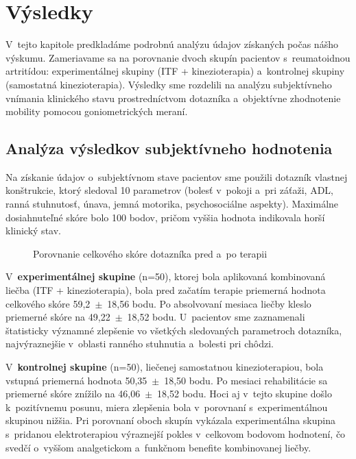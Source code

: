 \chapter{Výsledky}

V~tejto kapitole predkladáme podrobnú analýzu údajov získaných počas nášho výskumu. Zameriavame sa na porovnanie dvoch skupín pacientov s~reumatoidnou artritídou: experimentálnej skupiny (ITF + kinezioterapia) a~kontrolnej skupiny (samostatná kinezioterapia). Výsledky sme rozdelili na analýzu subjektívneho vnímania klinického stavu prostredníctvom dotazníka a~objektívne zhodnotenie mobility pomocou goniometrických meraní.

\section{Analýza výsledkov subjektívneho hodnotenia}

Na získanie údajov o~subjektívnom stave pacientov sme použili dotazník vlastnej konštrukcie, ktorý sledoval 10 parametrov (bolesť v~pokoji a~pri záťaži, ADL, ranná stuhnutosť, únava, jemná motorika, psychosociálne aspekty). Maximálne dosiahnuteľné skóre bolo 100 bodov, pričom vyššia hodnota indikovala horší klinický stav.

\begin{figure}[H]
    \centering
    \caption{Porovnanie celkového skóre dotazníka pred a~po terapii}
    \label{fig:graf_dotaznik}
\end{figure}

V~\textbf{experimentálnej skupine} (n=50), ktorej bola aplikovaná kombinovaná liečba (ITF + kinezioterapia), bola pred začatím terapie priemerná hodnota celkového skóre 59,2~$\pm$~18,56 bodu. Po absolvovaní mesiaca liečby kleslo priemerné skóre na 49,22~$\pm$~18,52 bodu. U~pacientov sme zaznamenali štatisticky významné zlepšenie vo všetkých sledovaných parametroch dotazníka, najvýraznejšie v~oblasti ranného stuhnutia a~bolesti pri chôdzi.

V~\textbf{kontrolnej skupine} (n=50), liečenej samostatnou kinezioterapiou, bola vstupná priemerná hodnota 50,35~$\pm$~18,50 bodu. Po mesiaci rehabilitácie sa priemerné skóre znížilo na 46,06~$\pm$~18,52 bodu. Hoci aj v~tejto skupine došlo k~pozitívnemu posunu, miera zlepšenia bola v~porovnaní s~experimentálnou skupinou nižšia. Pri porovnaní oboch skupín vykázala experimentálna skupina s~pridanou elektroterapiou výraznejší pokles v~celkovom bodovom hodnotení, čo svedčí o~vyššom analgetickom a~funkčnom benefite kombinovanej liečby.

